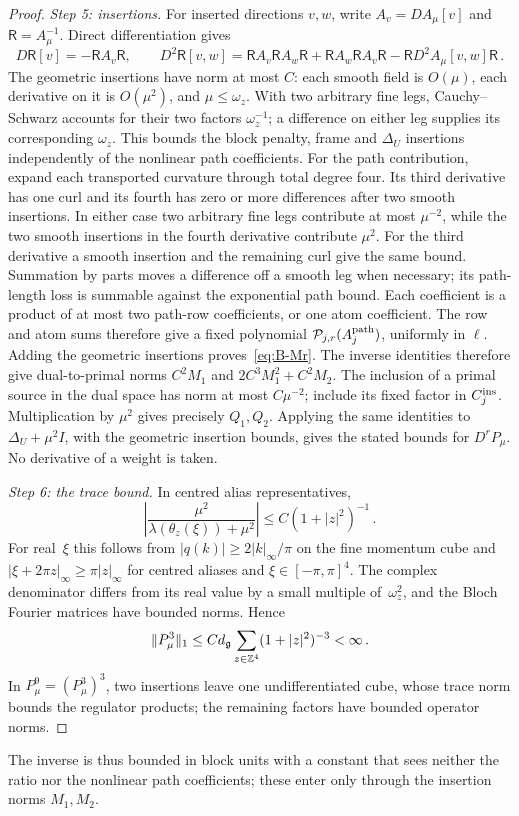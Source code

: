 \begin{proof}
\emph{Step 5: insertions.} For inserted directions $v,w$, write $A_v=DA_\mu[v]$ and $\mathsf R=A_\mu^{-1}$. Direct differentiation gives
\begin{equation*}
D\mathsf R[v]=-\mathsf RA_v\mathsf R,\qquad D^2\mathsf R[v,w]=\mathsf RA_v\mathsf RA_w\mathsf R+\mathsf RA_w\mathsf RA_v\mathsf R-\mathsf RD^2A_\mu[v,w]\mathsf R\,.
\end{equation*}
The geometric insertions have norm at most $C$: each smooth field is $O(\mu)$, each derivative on it is $O(\mu^2)$, and $\mu\le\omega_z$. With two arbitrary fine legs, Cauchy--Schwarz accounts for their two factors $\omega_z^{-1}$; a difference on either leg supplies its corresponding $\omega_z$. This bounds the block penalty, frame and $\Delta_U$ insertions independently of the nonlinear path coefficients. For the path contribution, expand each transported curvature through total degree four. Its third derivative has one curl and its fourth has zero or more differences after two smooth insertions. In either case two arbitrary fine legs contribute at most $\mu^{-2}$, while the two smooth insertions in the fourth derivative contribute $\mu^2$. For the third derivative a smooth insertion and the remaining curl give the same bound. Summation by parts moves a difference off a smooth leg when necessary; its path-length loss is summable against the exponential path bound. Each coefficient is a product of at most two path-row coefficients, or one atom coefficient. The row and atom sums therefore give a fixed polynomial $\mathcal P_{j,r}(A_j^{\rm path})$, uniformly in $\ell$. Adding the geometric insertions proves~\eqref{eq:B-Mr}. The inverse identities therefore give dual-to-primal norms $C^2M_1$ and $2C^3M_1^2+C^2M_2$. The inclusion of a primal source in the dual space has norm at most $C\mu^{-2}$; include its fixed factor in $C_j^{\rm ins}$. Multiplication by $\mu^2$ gives precisely $Q_1,Q_2$. Applying the same identities to $\Delta_U+\mu^2I$, with the geometric insertion bounds, gives the stated bounds for $D^rP_\mu$. No derivative of a weight is taken.

\emph{Step 6: the trace bound.} In centred alias representatives,
\begin{equation*}
\left|\frac{\mu^2}{\lambda(\theta_z(\xi))+\mu^2}\right|\le C(1+|z|^2)^{-1}\,.
\end{equation*}
For real~$\xi$ this follows from $|q(k)|\ge2|k|_\infty/\pi$ on the fine momentum cube and $|\xi+2\pi z|_\infty\ge\pi|z|_\infty$ for centred aliases and $\xi\in[-\pi,\pi]^4$. The complex denominator differs from its real value by a small multiple of~$\omega_z^2$, and the Bloch Fourier matrices have bounded norms. Hence
\begin{equation*}
\|P_\mu^3\|_1\le Cd_{\mathfrak{g}}\sum_{z\in\mathbb{Z}^4}(1+|z|^2)^{-3}<\infty\,.
\end{equation*}
In $P_\mu^9=(P_\mu^3)^3$, two insertions leave one undifferentiated cube, whose trace norm bounds the regulator products; the remaining factors have bounded operator norms.
\end{proof}
The inverse is thus bounded in block units with a constant that sees neither the ratio nor the nonlinear path coefficients; these enter only through the insertion norms $M_1,M_2$.

